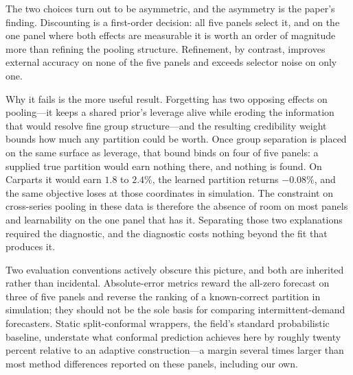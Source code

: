 \documentclass[twoside]{article}
\theoremstyle{definition}
\begin{document}
The two choices turn out to be asymmetric, and the asymmetry is the
paper's finding. Discounting is a first-order decision: all five panels
select it, and on the one panel where both effects are measurable it is
worth an order of magnitude more than refining the pooling structure.
Refinement, by contrast, improves external accuracy on none of the five
panels and exceeds selector noise on only one.

Why it fails is the more useful result. Forgetting has two opposing
effects on pooling---it keeps a shared prior's leverage alive while
eroding the information that would resolve fine group structure---and the
resulting credibility weight bounds how much any partition could be worth.
Once group separation is placed on the same surface as leverage, that
bound binds on four of five panels: a supplied true partition would earn
nothing there, and nothing is found. On Carparts it would earn $1.8$ to
$2.4\%$, the learned partition returns $-0.08\%$, and the same objective
loses at those coordinates in simulation. The constraint on cross-series
pooling in these data is therefore the absence of room on most panels and
learnability on the one panel that has it. Separating those two
explanations required the diagnostic, and the diagnostic costs nothing
beyond the fit that produces it.

Two evaluation conventions actively obscure this picture, and both are
inherited rather than incidental. Absolute-error metrics reward the
all-zero forecast on three of five panels and reverse the ranking of a
known-correct partition in simulation; they should not be the sole basis
for comparing intermittent-demand forecasters. Static split-conformal
wrappers, the field's standard probabilistic baseline, understate what
conformal prediction achieves here by roughly twenty percent relative to
an adaptive construction---a margin several times larger than most method
differences reported on these panels, including our own.
\end{document}

